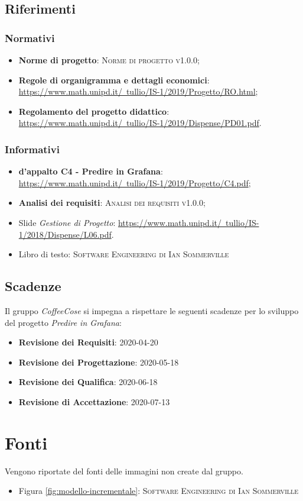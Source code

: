 \documentclass[../piano-di-progetto.tex]{subfiles}
\begin{document}
\subsection{Riferimenti}
\subsubsection{Normativi}
\begin{itemize}
  \item \textbf{Norme di progetto}: \textsc{Norme di progetto v1.0.0};
  \item \textbf{Regole di organigramma e dettagli economici}: \href{https://www.math.unipd.it/~tullio/IS-1/2019/Progetto/RO.html}{https://www.math.unipd.it/~tullio/IS-1/2019/Progetto/RO.html};
  \item \textbf{Regolamento del progetto didattico}: \href{https://www.math.unipd.it/~tullio/IS-1/2019/Dispense/PD01.pdf}{https://www.math.unipd.it/~tullio/IS-1/2019/Dispense/PD01.pdf}.
\end{itemize}

\subsubsection{Informativi}
\begin{itemize}
  \item \textbf{ d’appalto C4 - Predire in Grafana}: \href{https://www.math.unipd.it/~tullio/IS-1/2019/Progetto/C4.pdf}{https://www.math.unipd.it/~tullio/IS-1/2019/Progetto/C4.pdf};
  \item \textbf{Analisi dei requisiti}: \textsc{Analisi dei requisiti v1.0.0};
  \item Slide \emph{Gestione di Progetto}: \href{https://www.math.unipd.it/~tullio/IS-1/2018/Dispense/L06.pdf}{https://www.math.unipd.it/~tullio/IS-1/2018/Dispense/L06.pdf}.
  \item Libro di testo: \textsc{Software Engineering di Ian Sommerville}
\end{itemize}

\subsection{Scadenze}
\label{scadenze}
Il gruppo \emph{CoffeeCose} si impegna a rispettare le seguenti scadenze per lo sviluppo del progetto \emph{Predire in Grafana}:
\begin{itemize}
    \item \textbf{Revisione dei Requisiti}: 2020-04-20
    \item \textbf{Revisione dei Progettazione}: 2020-05-18
    \item \textbf{Revisione dei Qualifica}: 2020-06-18
    \item \textbf{Revisione di Accettazione}: 2020-07-13
\end{itemize}

\section{Fonti}
Vengono riportate del fonti delle immagini non create dal gruppo.
\begin{itemize}
    \item Figura \ref{fig:modello-incrementale}: \textsc{Software Engineering di Ian Sommerville}
\end{itemize}
\end{document}
